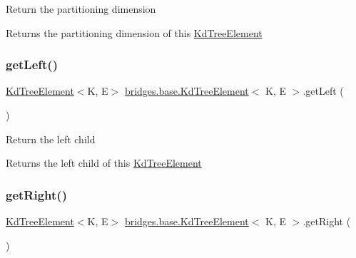 Return the partitioning dimension

\begin{DoxyReturn}{Returns}
the partitioning dimension of this \mbox{\hyperlink{classbridges_1_1base_1_1_kd_tree_element}{Kd\+Tree\+Element}} 
\end{DoxyReturn}
\mbox{\label{classbridges_1_1base_1_1_kd_tree_element_a257367edc8f204c973eb277dcb5d37be}} 
\subsubsection{\texorpdfstring{getLeft()}{getLeft()}}
{\footnotesize\ttfamily \mbox{\hyperlink{classbridges_1_1base_1_1_kd_tree_element}{Kd\+Tree\+Element}}$<$K, E$>$ \mbox{\hyperlink{classbridges_1_1base_1_1_kd_tree_element}{bridges.\+base.\+Kd\+Tree\+Element}}$<$ K, E $>$.get\+Left (\begin{DoxyParamCaption}{ }\end{DoxyParamCaption})}

Return the left child

\begin{DoxyReturn}{Returns}
the left child of this \mbox{\hyperlink{classbridges_1_1base_1_1_kd_tree_element}{Kd\+Tree\+Element}} 
\end{DoxyReturn}
\mbox{\label{classbridges_1_1base_1_1_kd_tree_element_a990694a36d44aba5f844f1752692c8e6}} 
\subsubsection{\texorpdfstring{getRight()}{getRight()}}
{\footnotesize\ttfamily \mbox{\hyperlink{classbridges_1_1base_1_1_kd_tree_element}{Kd\+Tree\+Element}}$<$K, E$>$ \mbox{\hyperlink{classbridges_1_1base_1_1_kd_tree_element}{bridges.\+base.\+Kd\+Tree\+Element}}$<$ K, E $>$.get\+Right (\begin{DoxyParamCaption}{ }\end{DoxyParamCaption})}

